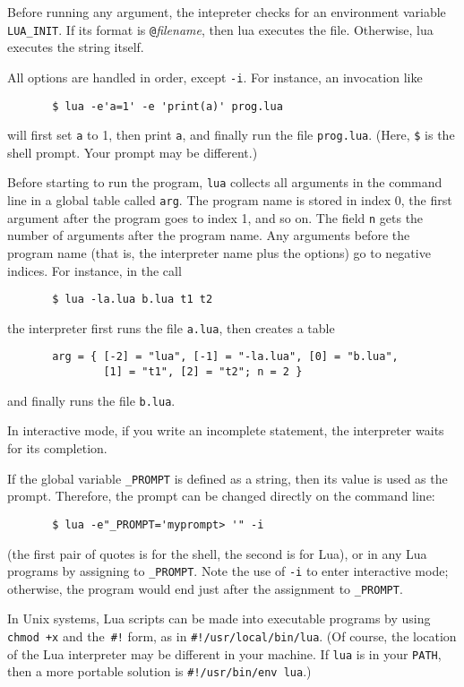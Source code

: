 \documentclass[11pt,twoside,draft]{article}
\makeatletter
\newcommand{\T}[1]{{\tt #1}}
\newcommand{\IndexVerb}[1]{\T{#1}\index{#1@{\tt #1}}}
\makeatother
\begin{document}
Before running any argument,
the intepreter checks for an environment variable \IndexVerb{LUA_INIT}.
If its format is \verb|@|\emph{filename},
then lua executes the file.
Otherwise, lua executes the string itself.

All options are handled in order, except \verb|-i|.
For instance, an invocation like
\begin{verbatim}
       $ lua -e'a=1' -e 'print(a)' prog.lua
\end{verbatim}
will first set \verb|a| to 1, then print \verb|a|,
and finally run the file \verb|prog.lua|.
(Here, \verb|$| is the shell prompt. Your prompt may be different.)

Before starting to run the program,
\verb|lua| collects all arguments in the command line
in a global table called \verb|arg|.
The program name is stored in index 0,
the first argument after the program goes to index 1,
and so on.
The field \verb|n| gets the number of arguments after the program name.
Any arguments before the program name
(that is, the interpreter name plus the options)
go to negative indices.
For instance, in the call
\begin{verbatim}
       $ lua -la.lua b.lua t1 t2
\end{verbatim}
the interpreter first runs the file \T{a.lua},
then creates a table
\begin{verbatim}
       arg = { [-2] = "lua", [-1] = "-la.lua", [0] = "b.lua",
               [1] = "t1", [2] = "t2"; n = 2 }
\end{verbatim}
and finally runs the file \T{b.lua}.

In interactive mode,
if you write an incomplete statement,
the interpreter waits for its completion.

If the global variable \IndexVerb{_PROMPT} is defined as a string,
then its value is used as the prompt.
Therefore, the prompt can be changed directly on the command line:
\begin{verbatim}
       $ lua -e"_PROMPT='myprompt> '" -i
\end{verbatim}
(the first pair of quotes is for the shell,
the second is for Lua),
or in any Lua programs by assigning to \verb|_PROMPT|.
Note the use of \verb|-i| to enter interactive mode; otherwise,
the program would end just after the assignment to \verb|_PROMPT|.

In Unix systems, Lua scripts can be made into executable programs
by using \verb|chmod +x| and the~\verb|#!| form,
as in \verb|#!/usr/local/bin/lua|.
(Of course,
the location of the Lua interpreter may be different in your machine.
If \verb|lua| is in your \verb|PATH|,
then a more portable solution is \verb|#!/usr/bin/env lua|.)
\end{document}
